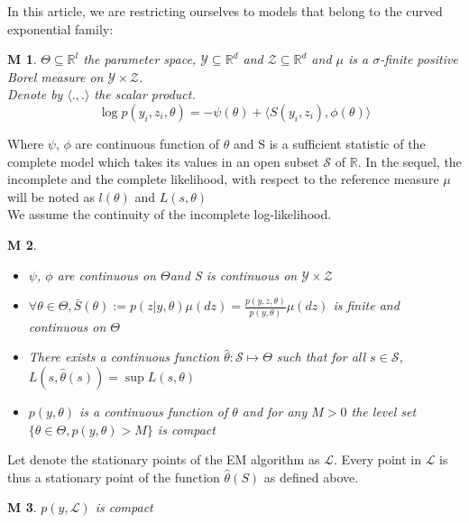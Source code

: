\documentclass[a4paper]{article}
\theoremstyle{plain}
\newtheorem{assumption}{M}
\theoremstyle{plain}
\theoremstyle{definition}
\begin{document}
In this article, we are restricting ourselves to models that belong to the curved exponential family:
\begin{assumption}
$\Theta \subseteq \mathbb{R}^l$ the parameter space, $ \mathcal{Y} \subseteq \mathbb{R}^d$ and $\mathcal{Z} \subseteq \mathbb{R}^d$ and $\mu$ is a $\sigma$-finite positive Borel measure on $\mathcal{Y} \times \mathcal{Z}$.\\
Denote by $\langle . { , }. \rangle$ the scalar product.
\begin{equation}
\log p(y_i,z_i,\theta) = -\psi(\theta) + \langle S(y_i,z_i), \phi(\theta)\rangle
\end{equation}
\end{assumption}
Where $\psi$, $\phi$ are continuous function of $\theta$ and S is a sufficient statistic of the complete model which takes its values in an open subset $\mathcal{S}$ of $\mathbb{R}$. In the sequel, the incomplete and the complete likelihood, with respect to the reference measure $\mu$ will be noted as $l(\theta)$ and $L(s,\theta)$\\
We assume the continuity of the incomplete log-likelihood. 

\begin{assumption}
\begin{itemize}
\item $\psi$, $\phi$ are continuous on $\Theta$and S is continuous on $\mathcal{Y} \times \mathcal{Z}$
\item $\forall \theta \in \Theta, \bar{S}(\theta):= p(z|y,\theta)\mu(dz) = \frac{p(y,z,\theta)}{p(y,\theta)}\mu(dz)$ is finite and continuous on $\Theta$
\item There exists a continuous function $\hat{\theta}: \mathcal{S} \mapsto \Theta$ such that for all $s \in \mathcal{S}$, $L(s,\hat{\theta}(s)) = \sup L(s,\theta)$
\item $p(y,\theta)$ is a continuous function of $\theta$ and for any $M > 0$ the level set $\{\theta \in \Theta, p(y,\theta) > M\}$ is compact
\end{itemize}
\end{assumption}


Let denote the stationary points of the EM algorithm as $\mathcal{L}$. Every point in $\mathcal{L}$ is thus a stationary point of the function $\hat{\theta}(S)$ as defined above.
\begin{assumption}
$p(y,\mathcal{L})$ is compact
\end{assumption}
\end{document}

